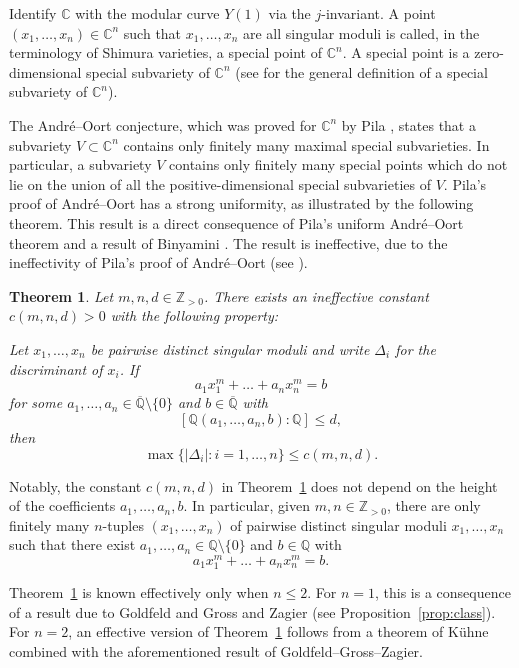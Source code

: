 \documentclass[11pt,a4paper, british]{amsart}
\newtheorem{thm}{Theorem}[section]
\theoremstyle{definition}
\theoremstyle{remark}
\numberwithin{equation}{section}
\newcommand{\alg}{\overline{\mathbb{Q}}} %
\newcommand{\Q}{\mathbb{Q}} %
\newcommand{\Z}{\mathbb{Z}} %
\newcommand{\C}{\mathbb{C}} %
\begin{document}
	Identify $\C$ with the modular curve $Y(1)$ via the $j$-invariant. A point $(x_1, \ldots, x_n) \in \C^n$ such that $x_1, \ldots, x_n$ are all singular moduli is called, in the terminology of Shimura varieties, a special point of $\C^n$. A special point is a zero-dimensional special subvariety of $\C^n$ (see \cite[Definition~4.10]{Pila22} for the general definition of a special subvariety of $\C^n$). 
	
	The Andr\'e--Oort conjecture, which was proved for $\C^n$ by Pila \cite{Pila11}, states that a subvariety $V \subset \C^n$ contains only finitely many maximal special subvarieties. In particular, a subvariety $V$ contains only finitely many special points which do not lie on the union of all the positive-dimensional special subvarieties of $V$. Pila's proof of Andr\'e--Oort has a strong uniformity, as illustrated by the following theorem. This result is a direct consequence of Pila's uniform Andr\'e--Oort theorem \cite[Theorem~13.2]{Pila11} and a result of Binyamini \cite[Corollary~4]{Binyamini19}. The result is ineffective, due to the ineffectivity of Pila's proof of Andr\'e--Oort (see \cite[\S13]{Pila11}).
	
	\begin{thm}\label{thm:ineffpowers}
		Let $m, n, d \in \Z_{>0}$. There exists an ineffective constant $c(m, n, d) > 0$ with the following property:
		 
		 Let $x_1, \ldots, x_n$ be pairwise distinct singular moduli and write $\Delta_i$ for the discriminant of $x_i$. If
		\[ a_1 x_1^m + \ldots + a_n x_n^m = b\]
		for some $a_1, \ldots, a_n \in \alg \setminus \{0\}$ and $b \in \alg$ with
		\[ [\Q(a_1, \ldots, a_n, b) : \Q] \leq d,\]
		then
		\[ \max \{ \lvert \Delta_i \rvert : i=1, \ldots, n\} \leq c(m, n, d).\]
	\end{thm}

Notably, the constant $c(m, n, d)$ in Theorem~\ref{thm:ineffpowers} does not depend on the height of the coefficients $a_1, \ldots, a_n, b$. In particular, given $m, n \in \Z_{>0}$, there are only finitely many $n$-tuples $(x_1, \ldots, x_n)$ of pairwise distinct singular moduli $x_1, \ldots, x_n$ such that there exist $a_1, \ldots, a_n \in \Q \setminus \{0\}$ and $b \in \Q$ with
\[ a_1 x_1^m + \ldots + a_n x_n^m = b.\]
	
 Theorem~\ref{thm:ineffpowers} is known effectively only when $n \leq 2$. For $n = 1$, this is a consequence of a result due to Goldfeld \cite{Goldfeld76} and Gross and Zagier \cite{GrossZagier86} (see Proposition~\ref{prop:class}). For $n = 2$, an effective version of Theorem~\ref{thm:ineffpowers} follows from a theorem of K\"uhne \cite[Theorem~4]{Kuhne13} combined with the aforementioned result of Goldfeld--Gross--Zagier.
 
\end{document}
